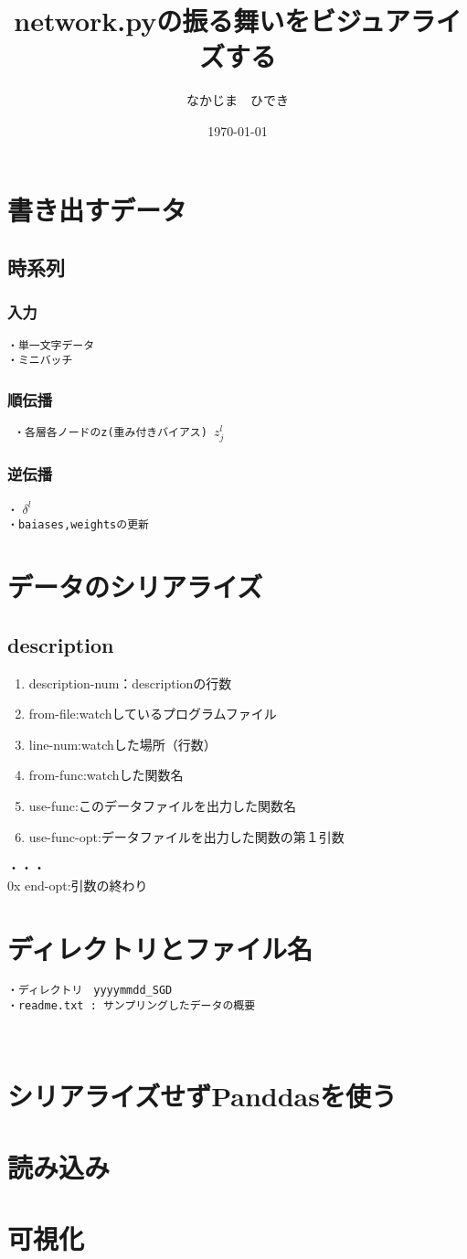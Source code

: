 \documentclass[11pt,a4paper,fleqn]{jsarticle}
\title{network.pyの振る舞いをビジュアライズする}
\author{なかじま　ひでき}
\date{\today}
\begin{document}
\maketitle
\section{書き出すデータ}
\subsection{時系列}
\subsubsection{入力}
\begin{verbatim}
・単一文字データ
・ミニバッチ
\end{verbatim}
\subsubsection{順伝播}
\verb| ・各層各ノードのz(重み付きバイアス) |$z^l_j$ \\
\subsubsection{逆伝播}
\verb|・| $\delta^l$ \\
\verb|・baiases,weightsの更新| \\

\section{データのシリアライズ}
\subsection{description}
\begin{enumerate}
 \item description-num：descriptionの行数 
 \item from-file:watchしているプログラムファイル 
 \item line-num:watchした場所（行数） 
 \item from-func:watchした関数名 
 \item use-func:このデータファイルを出力した関数名 
 \item use-func-opt:データファイルを出力した関数の第１引数 
\end{enumerate}
・・・\\
0x end-opt:引数の終わり \\
\section{ディレクトリとファイル名}
\verb|・ディレクトリ　yyyymmdd_SGD|\\
\verb|・readme.txt : サンプリングしたデータの概要|
\begin{verbatim}
 
\end{verbatim}
\section{シリアライズせずPanddasを使う}
\section{読み込み}
\section{可視化}
\end{document}
